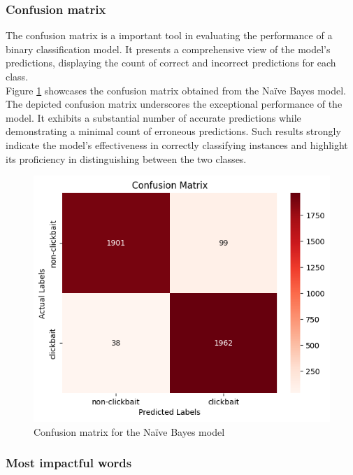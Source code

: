\documentclass{class}
\begin{document}
\subsubsection*{Confusion matrix}
The confusion matrix is a important tool in evaluating the performance of a binary classification model.
It presents a comprehensive view of the model's predictions, displaying the count of correct and incorrect predictions for each class.\\
Figure \ref{fig-12} showcases the confusion matrix obtained from the Na\"ive Bayes model.
The depicted confusion matrix underscores the exceptional performance of the model.
It exhibits a substantial number of accurate predictions while demonstrating a minimal count of erroneous predictions.
Such results strongly indicate the model's effectiveness in correctly classifying instances and highlight its proficiency
in distinguishing between the two classes.
\begin{figure}[h]
    \centering
    \includegraphics[width=0.5\columnwidth]{images/naive_conf_matrix.png}
    \caption{Confusion matrix for the Na\"ive Bayes model}
    \label{fig-12}
\end{figure}
\subsubsection*{Most impactful words}
\end{document}

